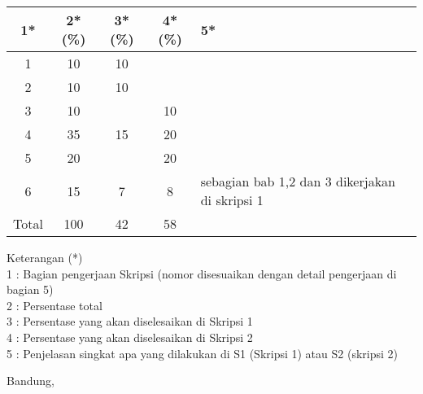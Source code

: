 \documentclass[a4paper,twoside]{article}
\begin{document}
\begin{center}
  \begin{tabular}{ | c | c | c | c | l |}
    \hline
    1*  & 2*(\%) & 3*(\%) & 4*(\%) &5*\\ \hline \hline
    1   & 10  & 10  &  &  \\ \hline
    2   & 10 & 10  &   & \\ \hline
    3   & 10  &   & 10 & \\ \hline
    4   & 35  & 15  & 20 &  \\ \hline
    5   & 20  &   & 20 & \\ \hline
    6   & 15  & 7  & 8  & {\footnotesize sebagian bab 1,2 dan 3 dikerjakan di skripsi 1}\\ \hline
    Total  & 100  & 42  & 58 &  \\ \hline
                          \end{tabular}
\end{center}

Keterangan (*)\\
1 : Bagian pengerjaan Skripsi (nomor disesuaikan dengan detail pengerjaan di bagian 5)\\
2 : Persentase total \\
3 : Persentase yang akan diselesaikan di Skripsi 1 \\
4 : Persentase yang akan diselesaikan di Skripsi 2 \\
5 : Penjelasan singkat apa yang dilakukan di S1 (Skripsi 1) atau S2 (skripsi 2)

\vspace{1cm}
\centering Bandung, \tanggal\\
\vspace{2cm} \nama \\ 
\vspace{1cm}
\end{document}
